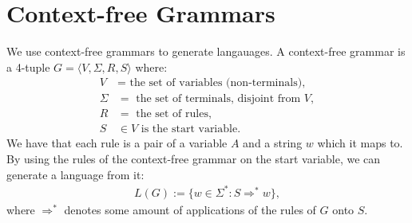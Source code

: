 \section{Context-free Grammars}

We use context-free grammars to generate langauages. A context-free grammar
is a 4-tuple $G = \langle V, \Sigma, R, S \rangle$ where: \begin{align*}
    V      &= \text{ the set of variables (non-terminals),}\\
    \Sigma &= \text{ the set of terminals, disjoint from } V, \\
    R      &= \text{ the set of rules},\\
    S      &\in V \text{ is the start variable}.
\end{align*} We have that each rule is a pair of a variable $A$ and a string $w$
which it maps to.
\\[\baselineskip]
By using the rules of the context-free grammar on the start variable, we can
generate a language from it: \begin{gather*}
    L(G) := \{w \in \Sigma^* : S \Rightarrow^* w \},
\end{gather*} where $\Rightarrow^*$ denotes some amount of applications
of the rules of $G$ onto $S$.